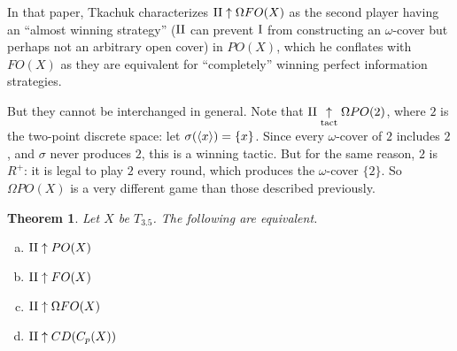 \documentclass[11pt]{article}
\theoremstyle{plain}
\newtheorem{theorem}{Theorem}
\theoremstyle{definition}
\theoremstyle{remark}
\theoremstyle{plain}
\theoremstyle{definition}
\theoremstyle{remark}
\begin{document}
In that paper, Tkachuk characterizes \(\mathrm{II}\uparrow\Omega FO(X)\)
as the second player having an ``almost winning strategy''
(\(\mathrm{II}\) can prevent \(\mathrm{I}\) from constructing an \(\omega\)-cover
but perhaps not an arbitrary open cover)
in \(PO(X)\), which he conflates with \(FO(X)\) as they are
equivalent for ``completely'' winning perfect information strategies. 

But they cannot be interchanged in general.
Note that \(\mathrm{II}\underset{\text{tact}}{\uparrow}\Omega PO(2)\), where \(2\) is the two-point discrete space:
let \(\sigma(\langle x\rangle)=\{x\}\). Since every \(\omega\)-cover of \(2\) includes \(2\),
and \(\sigma\) never produces \(2\), this is a winning tactic. But for the same
reason, \(2\) is \(R^+\): it is legal to play \(2\) every round,
which produces the \(\omega\)-cover \(\{2\}\).
So \(\Omega PO(X)\) is a very different game than those described previously.

\begin{theorem}
Let \(X\) be \(T_{3.5}\). The following are equivalent.
\begin{enumerate}[a)]
\item \(\mathrm{II} \uparrow PO(X)\)
\item \(\mathrm{II} \uparrow FO(X)\)
\item \(\mathrm{II} \uparrow \Omega FO(X)\)
\item \(\mathrm{II} \uparrow CD(C_p(X))\)
\end{enumerate}
\end{theorem}
\end{document}
